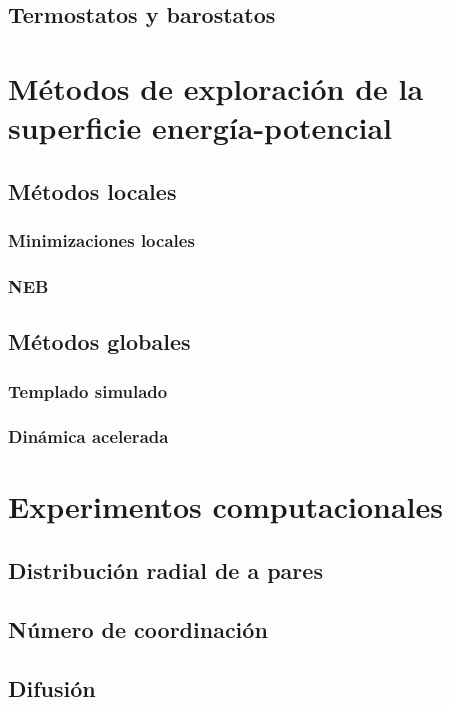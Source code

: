 \subsection{Termostatos y barostatos}


\section{Métodos de exploración de la superficie energía-potencial}

\subsection{Métodos locales}

\subsubsection{Minimizaciones locales}
\subsubsection{NEB}

\subsection{Métodos globales}

\subsubsection{Templado simulado}
\subsubsection{Dinámica acelerada}


\section{Experimentos computacionales}

\subsection{Distribución radial de a pares}

\subsection{Número de coordinación}

\subsection{Difusión}
